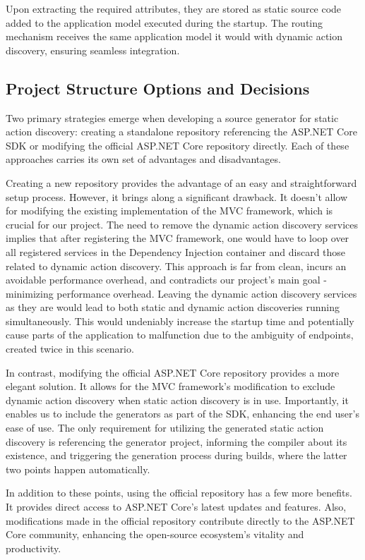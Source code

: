Upon extracting the required attributes, they are stored as static source code added to the application model executed during the startup. The routing mechanism receives the same application model it would with dynamic action discovery, ensuring seamless integration.

\subsection{Project Structure Options and Decisions}

Two primary strategies emerge when developing a source generator for static action discovery: creating a standalone repository referencing the ASP.NET Core SDK or modifying the official ASP.NET Core repository directly. Each of these approaches carries its own set of advantages and disadvantages.

Creating a new repository provides the advantage of an easy and straightforward setup process. However, it brings along a significant drawback. It doesn't allow for modifying the existing implementation of the MVC framework, which is crucial for our project. The need to remove the dynamic action discovery services implies that after registering the MVC framework, one would have to loop over all registered services in the Dependency Injection container and discard those related to dynamic action discovery. This approach is far from clean, incurs an avoidable performance overhead, and contradicts our project's main goal - minimizing performance overhead. Leaving the dynamic action discovery services as they are would lead to both static and dynamic action discoveries running simultaneously. This would undeniably increase the startup time and potentially cause parts of the application to malfunction due to the ambiguity of endpoints, created twice in this scenario.

In contrast, modifying the official ASP.NET Core repository provides a more elegant solution. It allows for the MVC framework's modification to exclude dynamic action discovery when static action discovery is in use. Importantly, it enables us to include the generators as part of the SDK, enhancing the end user's ease of use. The only requirement for utilizing the generated static action discovery is referencing the generator project, informing the compiler about its existence, and triggering the generation process during builds, where the latter two points happen automatically.

In addition to these points, using the official repository has a few more benefits. It provides direct access to ASP.NET Core's latest updates and features. Also, modifications made in the official repository contribute directly to the ASP.NET Core community, enhancing the open-source ecosystem's vitality and productivity.

